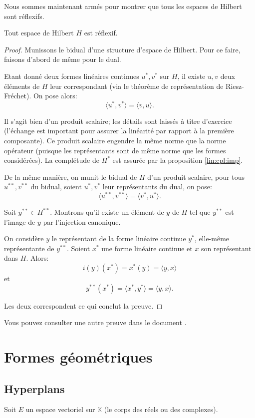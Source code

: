 Nous sommes maintenant armés pour montrer que tous les espaces
de Hilbert sont réflexifs.

\begin{thm}
  Tout espace de Hilbert $H$ est réflexif.
\end{thm}

\begin{proof}
  Munissons le bidual d'une structure d'espace de Hilbert.
  Pour ce faire, faisons d'abord de même pour le dual.

  Etant donné deux formes linéaires continues $u^*, v^*$ sur $H$,
  il existe $u, v$ deux éléments de $H$ leur correspondant (via
  le théorème de représentation de Riesz-Fréchet). On pose
  alors:
  $$\langle u^*, v^*\rangle = \langle v, u \rangle.$$

  Il s'agit bien d'un produit scalaire; les détails sont
  laissés à titre d'exercice (l'échange est important pour
  assurer la linéarité par rapport à la première composante).
  Ce produit scalaire engendre la même norme que la norme
  opérateur
  (puisque les représentants sont de même norme que
  les formes considérées). La complétude de $H^*$
  est assurée par la proposition \ref{lin:cpl:imp}.

  De la même manière, on munit le bidual de $H$ d'un
  produit scalaire, pour tous $u^{**}, v^{**}$ du bidual,
  soient $u^*, v^*$ leur représentants du dual, on pose:
    $$\langle u^{**}, v^{**}\rangle = \langle v^*, u^* \rangle.$$

  Soit $y^{**}\in H^{**}$. Montrons qu'il existe un élément
  de $y$ de $H$ tel que $y^{**}$ est l'image de $y$ par
  l'injection canonique.

  On considère $y$ le représentant de la forme linéaire continue
  $y^*$, elle-même représentante de $y^{**}$. Soient $x^*$ une forme
  linéaire continue et $x$ son représentant dans $H$. Alors:
  $$i(y)(x^*) = x^*(y) = \langle y, x\rangle$$
  et
  $$y^{**}(x^*) = \langle x^*, y^{*} \rangle = \langle y, x\rangle.$$

  Les deux correspondent ce qui  conclut la preuve.

\end{proof}

Vous pouvez consulter une autre preuve dans le document
\cite[p.~49]{refl:hilbert}.

\section{Formes géométriques}
\subsection{Hyperplans}
Soit $E$ un espace vectoriel sur $\mathbb{K}$
(le corps des réels ou des complexes).


